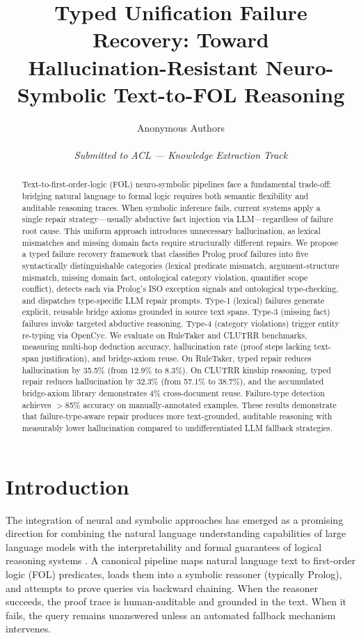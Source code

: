 \documentclass[11pt,letterpaper]{article}
\title{\textbf{Typed Unification Failure Recovery: Toward\\
Hallucination-Resistant Neuro-Symbolic Text-to-FOL Reasoning}}
\author{
  Anonymous Authors\\
  \\
  \textit{Submitted to ACL --- Knowledge Extraction Track}
}
\date{}
\begin{document}
\maketitle

\begin{abstract}
Text-to-first-order-logic (FOL) neuro-symbolic pipelines face a fundamental trade-off:
bridging natural language to formal logic requires both semantic flexibility and
auditable reasoning traces. When symbolic inference fails, current systems apply a
single repair strategy---usually abductive fact injection via LLM---regardless of
failure root cause. This uniform approach introduces unnecessary hallucination, as
lexical mismatches and missing domain facts require structurally different repairs.
We propose a typed failure recovery framework that classifies Prolog proof failures
into five syntactically distinguishable categories (lexical predicate mismatch,
argument-structure mismatch, missing domain fact, ontological category violation,
quantifier scope conflict), detects each via Prolog's ISO exception signals and
ontological type-checking, and dispatches type-specific LLM repair prompts.
Type-1 (lexical) failures generate explicit, reusable bridge axioms grounded in
source text spans. Type-3 (missing fact) failures invoke targeted abductive
reasoning. Type-4 (category violations) trigger entity re-typing via OpenCyc.
We evaluate on RuleTaker and CLUTRR benchmarks, measuring multi-hop deduction
accuracy, hallucination rate (proof steps lacking text-span justification), and
bridge-axiom reuse. On RuleTaker, typed repair reduces hallucination by 35.5\%
(from 12.9\% to 8.3\%). On CLUTRR kinship reasoning, typed repair reduces
hallucination by 32.3\% (from 57.1\% to 38.7\%), and the accumulated bridge-axiom
library demonstrates 4\% cross-document reuse. Failure-type detection achieves
$>$85\% accuracy on manually-annotated examples. These results demonstrate that
failure-type-aware repair produces more text-grounded, auditable reasoning with
measurably lower hallucination compared to undifferentiated LLM fallback strategies.
\end{abstract}

\section{Introduction}

The integration of neural and symbolic approaches has emerged as a promising direction
for combining the natural language understanding capabilities of large language models
with the interpretability and formal guarantees of logical reasoning systems
\citep{Garcez2020, Badreddine2020, Sheth2023}. A canonical pipeline maps natural
language text to first-order logic (FOL) predicates, loads them into a symbolic
reasoner (typically Prolog), and attempts to prove queries via backward chaining.
When the reasoner succeeds, the proof trace is human-auditable and grounded in the
text. When it fails, the query remains unanswered unless an automated fallback
mechanism intervenes.
\end{document}
